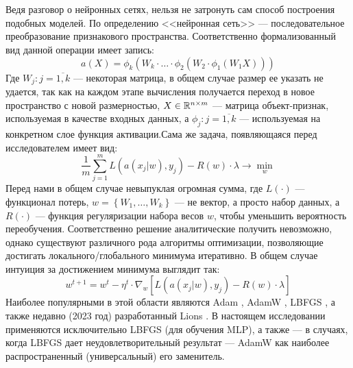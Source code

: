 \\\\
\indent Ведя разговор о нейронных сетях, нельзя не затронуть сам способ построения подобных моделей. По определению <<нейронная сеть>> --- последовательное преобразование признакового пространства. Соответственно формализованный вид данной операции имеет запись:
\begin{equation}
	a(X) = \phi_k(W_k \cdot \ldots \cdot \phi_2(W_2 \cdot \phi_1(W_1 X)))
\end{equation}
Где $W_j: j = \overline{1, k}$ --- некоторая матрица, в общем случае размер ее указать не удается, так как на каждом этапе вычисления получается переход в новое пространство с новой размерностью, $X \in \mathbb{R}^{n \times m}$ --- матрица объект-признак, используемая в качестве входных данных, а $\phi_j : j = \overline{1, k}$ --- используемая на конкретном слое функция активации.Сама же задача, появляющаяся перед исследователем имеет вид:
\begin{equation}
	\frac{1}{m} \sum_{j = 1}^m L(a(x_j | w), y_j) - R(w) \cdot \lambda \to \min_{w}
\end{equation}
Перед нами в общем случае невыпуклая огромная сумма, где $L(\cdot)$ --- функционал потерь, $w = \left\{W_1, \ldots, W_k\right\}$ --- не вектор, а просто набор данных, а $R(\cdot)$ --- функция регуляризации набора весов $w$, чтобы уменьшить вероятность переобучения. Соответственно решение аналитические получить невозможно, однако существуют различного рода алгоритмы оптимизации, позволяющие достигать локального/глобального минимума итеративно. В общем случае интуиция за достижением минимума выглядит так:
\begin{equation}
	w^{t + 1} = w^t - \eta^t \cdot \nabla_w \left[L(a(x_j | w), y_j) - R(w) \cdot \lambda\right]
\end{equation}
Наиболее популярными в этой области являются Adam \cite{kingma2014adam}, AdamW \cite{bock2018improvement}, LBFGS \cite{liu1989limited}, а также недавно (2023 год) разработанный Lions \cite{chen2023symbolic}. В настоящем исследовании применяются исключительно LBFGS (для обучения MLP), а также --- в случаях, когда LBFGS дает неудовлетворительный результат --- AdamW как наиболее распространенный (универсальный) его заменитель.


